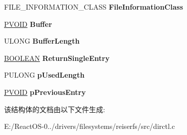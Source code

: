 \begin{DoxyCompactItemize}
F\+I\+L\+E\+\_\+\+I\+N\+F\+O\+R\+M\+A\+T\+I\+O\+N\+\_\+\+C\+L\+A\+SS {\bfseries File\+Information\+Class}
\item 
\mbox{\label{struct___r_f_s_d___c_a_l_l_b_a_c_k___c_o_n_t_e_x_t_ad637a69453f44a6c18ccb7a018142324}} 
\hyperlink{interfacevoid}{P\+V\+O\+ID} {\bfseries Buffer}
\item 
\mbox{\label{struct___r_f_s_d___c_a_l_l_b_a_c_k___c_o_n_t_e_x_t_a670c57fe32343a74ee58969a4ddc25aa}} 
U\+L\+O\+NG {\bfseries Buffer\+Length}
\item 
\mbox{\label{struct___r_f_s_d___c_a_l_l_b_a_c_k___c_o_n_t_e_x_t_a5283357a1210b946bf0b032450f6d029}} 
\hyperlink{_processor_bind_8h_a112e3146cb38b6ee95e64d85842e380a}{B\+O\+O\+L\+E\+AN} {\bfseries Return\+Single\+Entry}
\item 
\mbox{\label{struct___r_f_s_d___c_a_l_l_b_a_c_k___c_o_n_t_e_x_t_a034100493d8a7b56eafd2f1481f3325f}} 
P\+U\+L\+O\+NG {\bfseries p\+Used\+Length}
\item 
\mbox{\label{struct___r_f_s_d___c_a_l_l_b_a_c_k___c_o_n_t_e_x_t_a0b88e5ef6e75a0624fed724b762b2fdf}} 
\hyperlink{interfacevoid}{P\+V\+O\+ID} {\bfseries p\+Previous\+Entry}
\end{DoxyCompactItemize}


该结构体的文档由以下文件生成\+:\begin{DoxyCompactItemize}
\item 
E\+:/\+React\+O\+S-\/0../drivers/filesystems/reiserfs/src/dirctl.\+c\end{DoxyCompactItemize}
